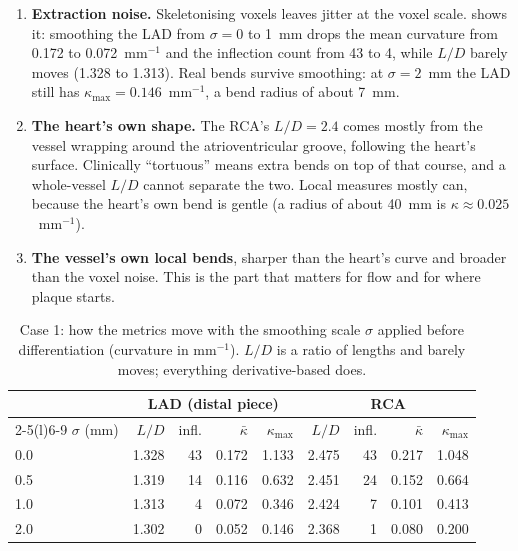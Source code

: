 \begin{enumerate}
  \item \textbf{Extraction noise.} Skeletonising voxels leaves jitter at the voxel scale.
     shows it: smoothing the LAD from $\sigma = 0$ to 1~mm drops the mean
    curvature from 0.172 to 0.072~mm$^{-1}$ and the inflection count from 43 to 4, while $L/D$
    barely moves (1.328 to 1.313). Real bends survive smoothing: at $\sigma = 2$~mm the LAD still
    has $\kappa_{\max} = 0.146$~mm$^{-1}$, a bend radius of about 7~mm.
  \item \textbf{The heart's own shape.} The RCA's $L/D = 2.4$ comes mostly from the vessel wrapping
    around the atrioventricular groove, following the heart's surface. Clinically ``tortuous''
    means extra bends on top of that course, and a whole-vessel $L/D$ cannot separate the two.
    Local measures mostly can, because the heart's own bend is gentle (a radius of about 40~mm is
    $\kappa \approx 0.025$~mm$^{-1}$).
  \item \textbf{The vessel's own local bends}, sharper than the heart's curve and broader than the
    voxel noise. This is the part that matters for flow and for where plaque starts.
\end{enumerate}

\begin{table}[htbp]
  \centering
  \small
  \begin{tabular}{@{}lrrrrrrrr@{}}
    \toprule
    & \multicolumn{4}{c}{LAD (distal piece)} & \multicolumn{4}{c}{RCA} \\
    \cmidrule(lr){2-5}\cmidrule(l){6-9}
    $\sigma$ (mm) & $L/D$ & infl. & $\bar\kappa$ & $\kappa_{\max}$ & $L/D$ & infl. & $\bar\kappa$ &
    $\kappa_{\max}$ \\
    \midrule
    0.0 & 1.328 & 43 & 0.172 & 1.133 & 2.475 & 43 & 0.217 & 1.048 \\
    0.5 & 1.319 & 14 & 0.116 & 0.632 & 2.451 & 24 & 0.152 & 0.664 \\
    1.0 & 1.313 &  4 & 0.072 & 0.346 & 2.424 &  7 & 0.101 & 0.413 \\
    2.0 & 1.302 &  0 & 0.052 & 0.146 & 2.368 &  1 & 0.080 & 0.200 \\
    \bottomrule
  \end{tabular}
  \caption{Case 1: how the metrics move with the smoothing scale $\sigma$ applied before
    differentiation (curvature in mm$^{-1}$). $L/D$ is a ratio of lengths and barely moves;
    everything derivative-based does.}
  \label{tab:week3-sweep}
\end{table}

